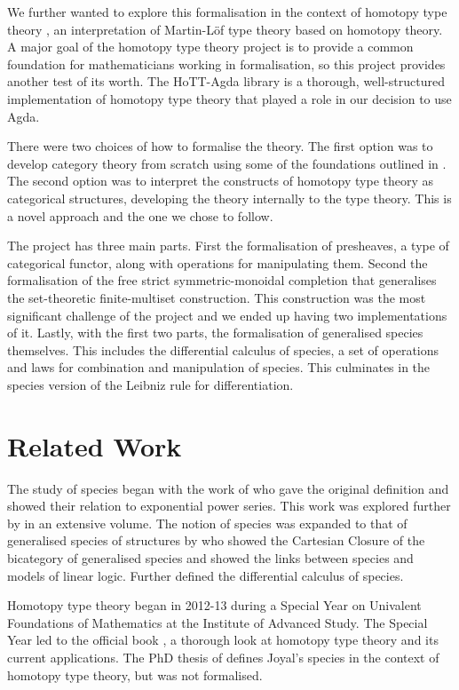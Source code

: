 \documentclass[12pt, parskip, DIV=14]{scrbook}
\begin{document}
We further wanted to explore this formalisation in the context of homotopy type theory \citep{hottbook}, an interpretation of Martin-L\"of type theory based on homotopy theory. A major goal of the homotopy type theory project is to provide a common foundation for mathematicians working in formalisation, so this project provides another test of its worth. The HoTT-Agda library \citep{hottagda} is a thorough, well-structured implementation of homotopy type theory that played a role in our decision to use Agda.

There were two choices of how to formalise the theory. The first option was to develop category theory from scratch using some of the foundations outlined in \citep{hottbook}. The second option was to interpret the constructs of homotopy type theory as categorical structures, developing the theory internally to the type theory. This is a novel approach and the one we chose to follow.

The project has three main parts. First the formalisation of presheaves, a type of categorical functor, along with operations for manipulating them. Second the formalisation of the free strict symmetric-monoidal completion that generalises the set-theoretic finite-multiset construction. This construction was the most significant challenge of the project and we ended up having two implementations of it. Lastly, with the first two parts, the formalisation of generalised species themselves. This includes the differential calculus of species, a set of operations and laws for combination and manipulation of species. This culminates in the species version of the Leibniz rule for differentiation.

\section{Related Work}

The study of species began with the work of \citet{joyal1981une, joyal1986foncteurs} who gave the original definition and showed their relation to exponential power series. This work was explored further by \citet{bergeron1998combinatorial} in an extensive volume. The notion of species was expanded to that of generalised species of structures by \citet{fiore2008cartesian} who showed the Cartesian Closure of the bicategory of generalised species and showed the links between species and models of linear logic. Further \citet{fiore2005mathematical} defined the differential calculus of species.

Homotopy type theory began in 2012-13 during a Special Year on Univalent Foundations of Mathematics at the Institute of Advanced Study. The Special Year led to the official book \citep{hottbook}, a thorough look at homotopy type theory and its current applications. The PhD thesis of \citet{yorgey2014combinatorial} defines Joyal's species in the context of homotopy type theory, but was not formalised.
\end{document}
